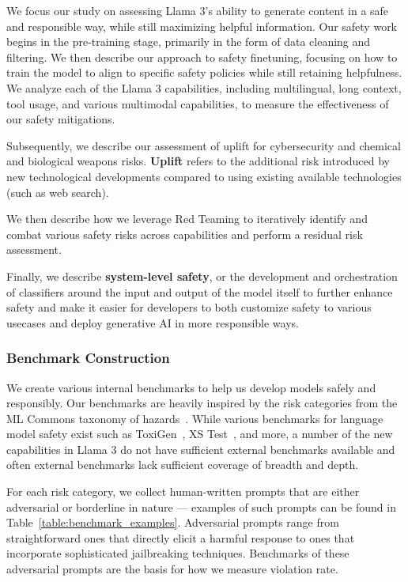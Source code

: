 We focus our study on assessing Llama 3's ability to generate content in a safe and responsible way, while still maximizing helpful information. Our safety work begins in the pre-training stage, primarily in the form of data cleaning and filtering. We then describe our approach to safety finetuning, focusing on how to train the model to align to specific safety policies while still retaining helpfulness. We analyze each of the Llama 3 capabilities, including multilingual, long context, tool usage, and various multimodal capabilities, to measure the effectiveness of our safety mitigations.

Subsequently, we describe our assessment of uplift for cybersecurity and chemical and biological weapons risks.
\textbf{Uplift} refers to the additional risk introduced by new technological developments compared to using existing available technologies (such as web search).

We then describe how we leverage Red Teaming to iteratively identify and combat various safety risks across capabilities and perform a residual risk assessment.

Finally, we describe \textbf{system-level safety}, or the development and orchestration of classifiers around the input and output of the model itself to further enhance safety and make it easier for developers to both customize safety to various usecases and deploy generative AI in more responsible ways.

\subsubsection{Benchmark Construction}

We create various internal benchmarks to help us develop models safely and responsibly. Our benchmarks are heavily inspired by the risk categories from the ML Commons taxonomy of hazards~\citep{vidgen2024introducing}. While various benchmarks for language model safety exist such as ToxiGen~\citep{hartvigsen2022toxigen}, XS Test~\citep{rottger2023xstest}, and more, a number of the new capabilities in Llama 3 do not have sufficient external benchmarks available and often external benchmarks lack sufficient coverage of breadth and depth.

For each risk category, we collect human-written prompts that are either adversarial or borderline in nature --- examples of such prompts can be found in Table~\ref{table:benchmark_examples}. Adversarial prompts range from straightforward ones that directly elicit a harmful response to ones that incorporate sophisticated jailbreaking techniques. Benchmarks of these adversarial prompts are the basis for how we measure violation rate. 

